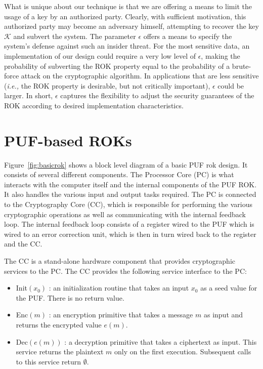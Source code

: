 What is unique about our technique is that we are offering a means to limit the usage of a key by an authorized
party.  Clearly, with sufficient motivation, this authorized party may become an adversary himself, attempting to
recover the key $\mathcal{K}$ and subvert the system.  The parameter $\epsilon$ offers a means to specify the system's
defense against such an insider threat.  For the most sensitive data, an implementation of our design could require
a very low level of $\epsilon$, making the probability of subverting the ROK property equal to the probability of
a brute-force attack on the cryptographic algorithm.  In applications that are less sensitive (\emph{i.e.,} the
ROK property is desirable, but not critically important), $\epsilon$ could be larger.  In short, $\epsilon$ captures the
flexibility to adjust the security guarantees of the ROK according to desired implementation characteristics.

\section{PUF-based ROKs}
Figure~\ref{fig:basicrok} shows a block level diagram of a basic PUF rok design. It consists of several different
components. The Processor Core (PC) is what interacts with the computer itself and the internal components of the
PUF ROK. It also handles the various input and output tasks required.
 The PC is connected to the Cryptography Core (CC), which is responsible for performing the various
cryptographic operations as well as communicating with the internal feedback loop.
The internal feedback loop consists of a register wired to the PUF which is wired to an error correction unit, which
is then in turn wired back to the register and the CC.

The CC is a stand-alone hardware component that provides cryptographic services to the PC.  The CC provides the 
following service interface to the PC:
\begin{itemize}
\item {\sf Init}$(x_0)$ : an initialization routine that takes an input $x_0$ as a seed value for the PUF.  There is no return value.
\item {\sf Enc}$(m)$ : an encryption primitive that takes a message $m$ as input and returns the encrypted value $e(m)$.
\item {\sf Dec}$(e(m))$ : a decryption primitive that takes a ciphertext as input.  This service returns the plaintext $m$ only
on the first execution.  Subsequent calls to this service return $\emptyset$.
\end{itemize}


